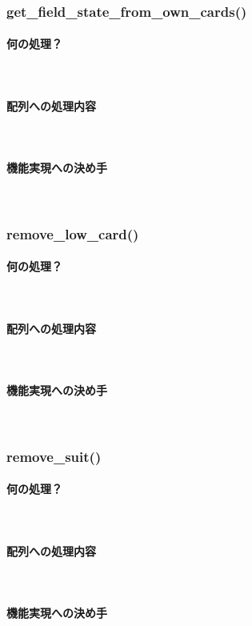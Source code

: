 \documentclass[11pt,a4paper, uplatex]{jsarticle}
\begin{document}
\subsubsection{get\_field\_state\_from\_own\_cards()}
\paragraph{何の処理？}\mbox{}\\
\paragraph{配列への処理内容}\mbox{}\\
\paragraph{機能実現への決め手}\mbox{}\\
%
\subsubsection{remove\_low\_card()}
\paragraph{何の処理？}\mbox{}\\
\paragraph{配列への処理内容}\mbox{}\\
\paragraph{機能実現への決め手}\mbox{}\\
%
\subsubsection{remove\_suit()}
\paragraph{何の処理？}\mbox{}\\
\paragraph{配列への処理内容}\mbox{}\\
\paragraph{機能実現への決め手}\mbox{}\\
%
\end{document}
